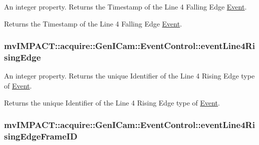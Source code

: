 An integer property. Returns the Timestamp of the Line 4 Falling Edge \hyperlink{classmv_i_m_p_a_c_t_1_1acquire_1_1_event}{Event}. 

Returns the Timestamp of the Line 4 Falling Edge \hyperlink{classmv_i_m_p_a_c_t_1_1acquire_1_1_event}{Event}. \hypertarget{classmv_i_m_p_a_c_t_1_1acquire_1_1_gen_i_cam_1_1_event_control_a54484f39df6ce0946e21f133f93a0be8}{
\subsubsection[{event\+Line4\+Rising\+Edge}]{ mv\+I\+M\+P\+A\+C\+T\+::acquire\+::\+Gen\+I\+Cam\+::\+Event\+Control\+::event\+Line4\+Rising\+Edge}}\label{classmv_i_m_p_a_c_t_1_1acquire_1_1_gen_i_cam_1_1_event_control_a54484f39df6ce0946e21f133f93a0be8}


An integer property. Returns the unique Identifier of the Line 4 Rising Edge type of \hyperlink{classmv_i_m_p_a_c_t_1_1acquire_1_1_event}{Event}. 

Returns the unique Identifier of the Line 4 Rising Edge type of \hyperlink{classmv_i_m_p_a_c_t_1_1acquire_1_1_event}{Event}. \hypertarget{classmv_i_m_p_a_c_t_1_1acquire_1_1_gen_i_cam_1_1_event_control_a51554cfb66277383c7e1973ccd296caa}{
\subsubsection[{event\+Line4\+Rising\+Edge\+Frame\+I\+D}]{ mv\+I\+M\+P\+A\+C\+T\+::acquire\+::\+Gen\+I\+Cam\+::\+Event\+Control\+::event\+Line4\+Rising\+Edge\+Frame\+I\+D}}\label{classmv_i_m_p_a_c_t_1_1acquire_1_1_gen_i_cam_1_1_event_control_a51554cfb66277383c7e1973ccd296caa}


